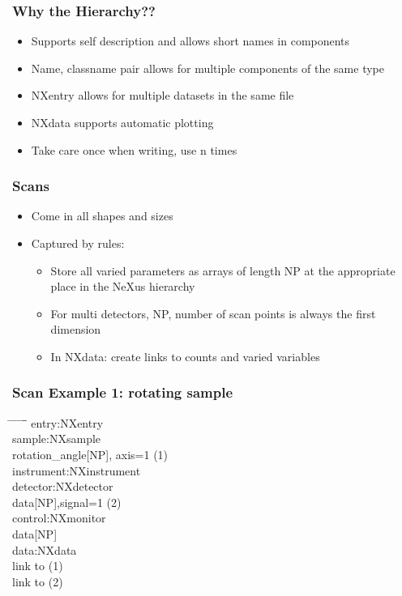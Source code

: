 \documentclass{beamer}
\begin{document}
\begin{frame} \frametitle{Why the Hierarchy??}
\begin{itemize}
\item<1->Supports self description and allows short names in components
\item<2->Name, classname pair allows for multiple components of the same type
\item<3->NXentry allows for multiple datasets in the same file
\item<4->NXdata supports automatic plotting
\item<5->Take care once when writing, use n times
\end{itemize}
\end{frame}

\begin{frame}
\frametitle{Scans}
\begin{itemize}
\item Come in all shapes and sizes
\item Captured by rules:
\begin{itemize}
\item Store all varied parameters as arrays of length NP at the appropriate place in the NeXus 
 hierarchy
\item For multi detectors, NP, number of scan points is always the first dimension
\item In NXdata: create links to counts and varied variables
\end{itemize}
\end{itemize}
\end{frame}


\begin{frame}
\frametitle{Scan Example 1: rotating sample}

\begin{tabbing}
\hspace*{1cm} \= \hspace*{1cm} \= \hspace*{1cm} \= \hspace*{1cm} \= \hspace*{1cm} \= \hspace*{1cm}\= \kill
entry:NXentry \\
 \>sample:NXsample\\
 \> \> rotation\_angle[NP], axis=1 (1) \\
 \> instrument:NXinstrument\\
 \>  \>detector:NXdetector\\
 \>  \> \>data[NP],signal=1 (2)\\
 \>control:NXmonitor\\  
 \> \>data[NP]\\  
 \>data:NXdata\\
 \> \> link to (1)\\
 \> \> link to (2) \\
\end{tabbing}
\end{frame}
\end{document}
